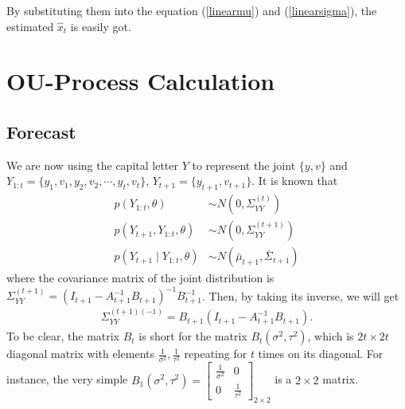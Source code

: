 By substituting them into the equation (\ref{linearmu}) and (\ref{linearsigma}), the estimated $\hat{x}_t$ is easily got. 



\section{OU-Process Calculation}\label{OUcalculation}

\subsection*{Forecast}
We are now using the capital letter $Y$ to represent the joint $\{y,v\}$ and $Y_{1:t} = \{y_1,v_1,y_2,v_2,\cdots, y_t, v_t \}$, $Y_{t+1} = \{y_{t+1}, v_{t+1}\}$. It is known that 
\begin{align*}
p(Y_{1:t},\theta) &\sim N\left( 0,\Sigma_{YY}^{(t)} \right)\\
p(Y_{t+1},Y_{1:t},\theta) &\sim N\left( 0,\Sigma_{YY}^{(t+1)} \right)\\
p(Y_{t+1}\mid Y_{1:t},\theta) &\sim N\left( \bar{\mu}_{t+1},\bar{\Sigma}_{t+1} \right)
\end{align*}
where the covariance matrix of the joint distribution is $\Sigma_{YY}^{(t+1)} = (I_{t+1}-A_{t+1}^{-1}B_{t+1})^{-1}B_{t+1}^{-1}$. Then, by taking its inverse, we will get
\begin{align*}
\Sigma_{YY}^{(t+1) (-1)} = B_{t+1}(I_{t+1}-A_{t+1}^{-1}B_{t+1}).
\end{align*}
To be clear, the matrix $B_t$ is short for the matrix $B_t(\sigma^2,\tau^2)$, which is $2t\times 2t$ diagonal matrix with elements $\frac{1}{\sigma^2},\frac{1}{\tau^2}$ repeating for $t$ times on its diagonal. For instance, the very simple $B_1(\sigma^2,\tau^2) = 
\begin{bmatrix}
\frac{1}{\sigma^2} & 0  \\
0 & \frac{1}{\tau^2}
\end{bmatrix}_{2\times 2}$ is a $2\times 2$ matrix. 

